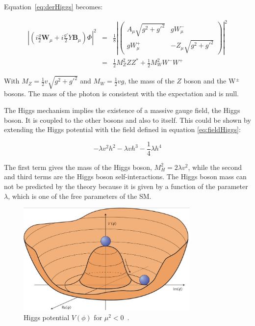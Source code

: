       Equation~\ref{eq:derHiggs} becomes:

      \begin{equation}
        \begin{array}{rcl}
       \left|\left(i\frac{g}{2}\textbf{W}_{\mu} +i\frac{g'}{2}Y\textbf{B}_{\mu}\right) \Phi \right|^2 & = & \frac{1}{8} \left| 
          \begin{pmatrix}
            A_{\mu}\sqrt{g^2 + g'^2} & gW^-_{\mu} \\
            gW^+_{\mu} & -Z_{\mu}\sqrt{g^2 + g'^2}
          \end{pmatrix}
       \right|^2 \\
        & = & \frac{1}{2}M^2_Z ZZ^* + \frac{1}{2}M^2_W W^-W^+
        \end{array}
      \end{equation}

      With $M_Z = \frac{1}{2}v\sqrt{g^2 + g'^2}$ and $M_W = \frac{1}{2} vg$, the mass of the $Z$ boson and the W$^{\pm}$ bosons. 
      The mass of the photon is consistent with the expectation and is null. 

      The Higgs mechanism implies the existence of a massive gauge field, the Higgs boson.
      It is coupled to the other bosons and also to itself.
      This could be shown by extending the Higgs potential with the field defined in equation \ref{eq:fieldHiggs}:

      \begin{equation}
        -\lambda v^2h^2 - \lambda v h^3 - \frac{1}{4}\lambda h^4
      \end{equation}

      The first term gives the mass of the Higgs boson, $M^2_H = 2\lambda v^2$, while the second and third terms are the Higgs boson self-interactions.
      The Higgs boson mass can not be predicted by the theory because it is given by a function of the parameter $\lambda$, which is one of the free parameters of the \gls{SM}.
      
      \begin{figure}[!h]
        \centering
        \includegraphics[width = 0.8\textwidth]{Pictures/SM/higgsPotential.png}
        \caption{Higgs potential $V(\phi)$ for $\mu^2 < 0$~\cite{deBoer:2013pud}.}
        \label{fig:scalarPotential}
      \end{figure}

